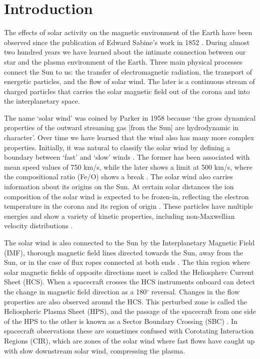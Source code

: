 \documentclass[utf8]{frontiersSCNS} %
\begin{document}
\section{Introduction}
The effects of solar activity on the magnetic environment of the Earth have been observed since the publication of Edward Sabine's work in 1852 \citep{Sabine1852}. During almost two hundred years we have learned about the intimate connection between our star and the plasma environment of the Earth. Three main physical processes connect the Sun to us: the transfer of electromagnetic radiation, the transport of energetic particles, and the flow of solar wind. The later is a continuous stream of charged particles that carries the solar magnetic field out of the corona and into the interplanetary space.

The name `solar wind' was coined by Parker in 1958 because `the gross dynamical properties of the outward streaming gas [from the Sun] are hydrodynamic in character'\citep{Parker1958}. Over time we have learned that the wind also has many more complex properties. Initially, it was natural to classify the solar wind by defining a boundary between `fast' and `slow' winds \citep{Habbal1997}. The former has been associated with mean speed values of 750 km/s, while the later shows a limit at 500 km/s, where the compositional ratio (Fe/O) shows a break \citep{Feldman2005,Stakhiv2015}. The solar wind also carries information about its origins on the Sun. At certain solar distances the ion composition of the solar wind is expected to be frozen-in, reflecting the electron temperature in the corona and its region of origin \citep{Feldman2005,Zhao2009,Stakhiv2015}. These particles have multiple energies and show a variety of kinetic properties, including non-Maxwellian velocity distributions \citep{Pierrard2010,Matteini2012}.

The solar wind is also connected to the Sun by the Interplanetary Magnetic Field (IMF), thorough magnetic field lines directed towards the Sun, away from the Sun, or in the case of flux ropes connected at both ends \citep{Owens2016,Gosling2010}. The thin region where solar magnetic fields of opposite directions meet is called the Heliospherc Current Sheet (HCS). When a spacecraft crosses the HCS instruments onboard can detect the change in magnetic field direction as a 180$^\circ$ reversal. Changes in the flow properties are also observed around the HCS. This perturbed zone is called the Heliospheric Plasma Sheet (HPS), and the passage of the spacecraft from one side of the HPS to the other is known as a Sector Boundary Crossing (SBC) \citep{Winterhalter1994}. In spacecraft observations these are sometimes confused with Corotating Interaction Regions (CIR), which are zones of the solar wind where fast flows have caught up with slow downstream solar wind, compressing the plasma.
\end{document}
